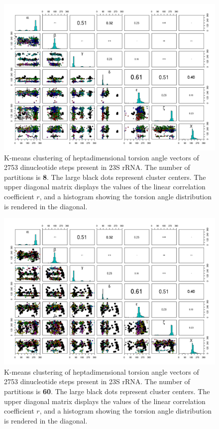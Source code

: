 \begin{figure}
 \centering
 \includegraphics[angle=90, scale=0.50]{Chapter2/hartigan_k8_b.png}
 \caption{K-means clustering of  heptadimensional torsion angle vectors
of  2753  dinucleotide  steps  present  in 23S  rRNA.  The  number  of
partitions  is  \textbf{8}.  The  large  black  dots  represent cluster
centers. The upper diagonal matrix displays the values of the linear
correlation coefficient $r$, and a histogram showing the torsion angle
distribution is rendered in the diagonal.}
 \label{fig:k8}
 \end{figure}
 
\begin{figure}[htbp]
 \centering
 \includegraphics[angle=90, scale=0.50]{Chapter2/hartigan_k60_b.png}
 \caption{K-means clustering of  heptadimensional torsion angle vectors
of  2753  dinucleotide  steps  present  in 23S  rRNA.  The  number  of
partitions  is  \textbf{60}.  The  large  black  dots represent cluster
centers. The upper diagonal matrix displays the values of the linear
correlation coefficient $r$, and a histogram showing the torsion angle
distribution is rendered in the diagonal.}
 \label{fig:k60}
 \end{figure}

